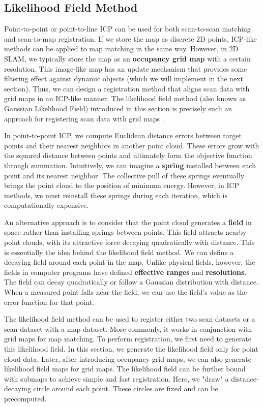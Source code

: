 \subsection{Likelihood Field Method}
\label{sec:likelihood-field}

Point-to-point or point-to-line ICP can be used for both scan-to-scan matching and scan-to-map registration. If we store the map as discrete 2D points, ICP-like methods can be applied to map matching in the same way. However, in 2D SLAM, we typically store the map as an \textbf{occupancy grid map} with a certain resolution. This image-like map has an update mechanism that provides some filtering effect against dynamic objects (which we will implement in the next section). Thus, we can design a registration method that aligns scan data with grid maps in an ICP-like manner. The likelihood field method (also known as Gaussian Likelihood Field) introduced in this section is precisely such an approach for registering scan data with grid maps \cite{Thrun2005}.

In point-to-point ICP, we compute Euclidean distance errors between target points and their nearest neighbors in another point cloud. These errors grow with the squared distance between points and ultimately form the objective function through summation. Intuitively, we can imagine a \textbf{spring} installed between each point and its nearest neighbor. The collective pull of these springs eventually brings the point cloud to the position of minimum energy. However, in ICP methods, we must reinstall these springs during each iteration, which is computationally expensive. 

An alternative approach is to consider that the point cloud generates a \textbf{field} in space rather than installing springs between points. This field attracts nearby point clouds, with its attractive force decaying quadratically with distance. This is essentially the idea behind the likelihood field method. We can define a decaying field around each point in the map. Unlike physical fields, however, the fields in computer programs have defined \textbf{effective ranges} and \textbf{resolutions}. The field can decay quadratically or follow a Gaussian distribution with distance. When a measured point falls near the field, we can use the field's value as the error function for that point.

The likelihood field method can be used to register either two scan datasets or a scan dataset with a map dataset. More commonly, it works in conjunction with grid maps for map matching. To perform registration, we first need to generate this likelihood field. In this section, we generate the likelihood field only for point cloud data. Later, after introducing occupancy grid maps, we can also generate likelihood field maps for grid maps. The likelihood field can be further bound with submaps to achieve simple and fast registration. Here, we "draw" a distance-decaying circle around each point. These circles are fixed and can be precomputed.


